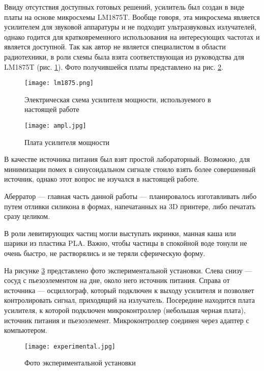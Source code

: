 Ввиду отсутствия доступных готовых решений, усилитель был создан в виде платы на основе микросхемы LM1875T. Вообще говоря, эта микросхема является усилителем для звуковой аппаратуры и не подходит ультразвуковых излучателей, однако годится для кратковременного использования на интересующих частотах и является доступной. Так как автор не является специалистом в области радиотехники, в роли схемы была взята соответствующая из руководства для LM1875T \cite{lm1875} (рис. \ref{fig:lm1875}). Фото получившейся платы представлено на рис. \ref{fig:ampl}.

\begin{figure}[H]
	\centering
	\texttt{[image: lm1875.png]}
	\caption{Электрическая схема усилителя мощности, используемого в настоящей работе}
	\label{fig:lm1875}
\end{figure}

\begin{figure}[H]
	\centering
	\texttt{[image: ampl.jpg]}
	\caption{Плата усилителя мощности}
	\label{fig:ampl}
\end{figure}

В качестве источника питания был взят простой лабораторный. Возможно, для минимизации помех в синусоидальном сигнале стоило взять более совершенный источник, однако этот вопрос не изучался в настоящей работе. 

Аберратор --- главная часть данной работы --- планировалось изготавливать либо путем отливки силикона в формах, напечатанных на 3D принтере, либо печатать сразу целиком.

В роли левитирующих частиц могли выступать икринки, манная каша или шарики из пластика PLA. Важно, чтобы частицы в спокойной воде тонули не очень быстро, не растворялись и не теряли сферическую форму.

На рисунке \ref{fig:experimental} представлено фото экспериментальной установки. Слева снизу --- сосуд с пьезоэлементом на дне, около него источник питания. Справа от источника --- осциллограф, который подключен к выходу усилителя и позволяет контролировать сигнал, приходящий на излучатель. Посередине находится плата усилителя, к которой подключен микроконтроллер (небольшая черная плата), источник питания и пьезоэлемент. Микроконтроллер соединен через адаптер с компьютером.

\begin{figure}[H]
	\centering
	\texttt{[image: experimental.jpg]}
	\caption{Фото экспериментальной установки}
	\label{fig:experimental}
\end{figure} 


